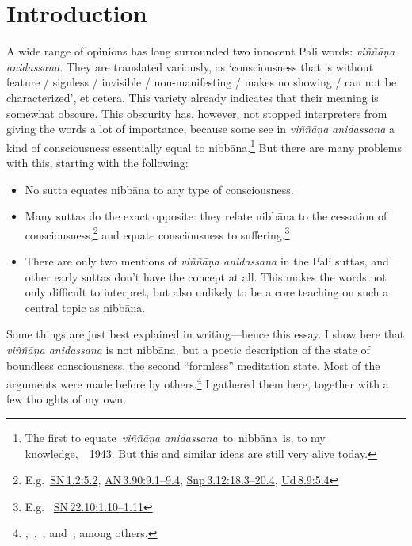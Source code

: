 \documentclass[10pt, openany]{book}
\begin{document}
\chapter{Introduction}
A wide range of opinions has long surrounded two innocent Pali words: \textit{viññāṇa anidassana}. They are translated variously, as ‘consciousness that is without feature / signless / invisible / non-manifesting / makes no showing / can not be characterized’, et cetera. This variety already indicates that their meaning is somewhat obscure. This obscurity has, however, not stopped interpreters from giving the words a lot of importance, because some see in \textit{viññāṇa} \textit{anidassana} a kind of consciousness essentially equal to nibbāna.\footnote {The first to equate \textit{viññāṇa anidassana} to nibbāna is, to my knowledge, \cite{Falk} 1943. But this and similar ideas are still very alive today.} But there are many problems with this, starting with the following:


\begin{itemize}

\itemsep5pt\parskip0pt


\item
No sutta equates nibbāna to any type of consciousness.



\item
Many suttas do the exact opposite: they relate nibbāna to the cessation of consciousness,\footnote {E.g. \href{https://suttacentral.net/sn1.2/en/sujato\#5.2}{SN 1.2:5.2}, \href{https://suttacentral.net/an3.90/en/sujato\#9.1}{AN 3.90:9.1–9.4}, \href{https://suttacentral.net/snp3.12/en/sujato\#18.3}{Snp 3.12:18.3–20.4}, \href{https://suttacentral.net/ud8.9/en/sujato\#5.4}{Ud 8.9:5.4}} and equate consciousness to suffering.\footnote {E.g.  \href{https://suttacentral.net/sn22.10/en/sujato\#1.10}{SN 22.10:1.10–1.11}}



\item
There are only two mentions of \textit{viññāṇa anidassana} in the Pali suttas, and other early suttas don’t have the concept at all. This makes the words not only difficult to interpret, but also unlikely to be a core teaching on such a central topic as nibbāna.





\end{itemize}
Some things are just best explained in writing—hence this essay. I show here that \textit{viññāṇa anidassana} is not nibbāna, but a poetic description of the state of boundless consciousness, the second “formless” meditation state. Most of the arguments were made before by others.\footnote {\cite{Anālayo 2017}, \cite{Brahmali}, \cite{Sujato 2011a}, and \cite{Sujato 2011b}, among others.} I gathered them here, together with a few thoughts of my own.
\end{document}
